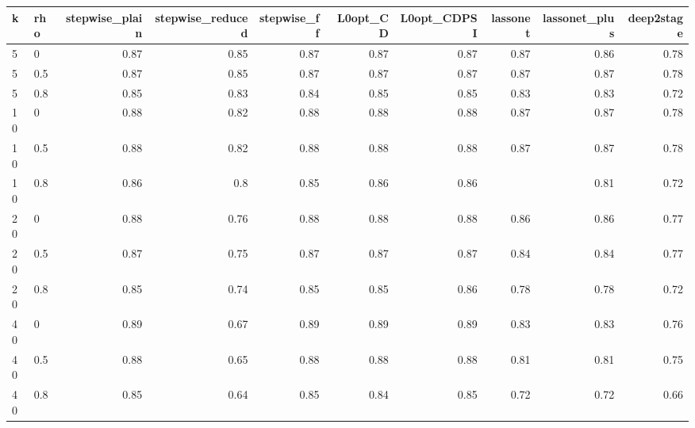 \begin{tabular}{llrrrrrrrr}
\toprule
k & rho & stepwise\_plain & stepwise\_reduced & stepwise\_ff & L0opt\_CD & L0opt\_CDPSI & lassonet & lassonet\_plus & deep2stage \\
\midrule
5 & 0 & 0.87 & 0.85 & 0.87 & 0.87 & 0.87 & 0.87 & 0.86 & 0.78 \\
5 & 0.5 & 0.87 & 0.85 & 0.87 & 0.87 & 0.87 & 0.87 & 0.87 & 0.78 \\
5 & 0.8 & 0.85 & 0.83 & 0.84 & 0.85 & 0.85 & 0.83 & 0.83 & 0.72 \\
10 & 0 & 0.88 & 0.82 & 0.88 & 0.88 & 0.88 & 0.87 & 0.87 & 0.78 \\
10 & 0.5 & 0.88 & 0.82 & 0.88 & 0.88 & 0.88 & 0.87 & 0.87 & 0.78 \\
10 & 0.8 & 0.86 & 0.8 & 0.85 & 0.86 & 0.86 &  & 0.81 & 0.72 \\
20 & 0 & 0.88 & 0.76 & 0.88 & 0.88 & 0.88 & 0.86 & 0.86 & 0.77 \\
20 & 0.5 & 0.87 & 0.75 & 0.87 & 0.87 & 0.87 & 0.84 & 0.84 & 0.77 \\
20 & 0.8 & 0.85 & 0.74 & 0.85 & 0.85 & 0.86 & 0.78 & 0.78 & 0.72 \\
40 & 0 & 0.89 & 0.67 & 0.89 & 0.89 & 0.89 & 0.83 & 0.83 & 0.76 \\
40 & 0.5 & 0.88 & 0.65 & 0.88 & 0.88 & 0.88 & 0.81 & 0.81 & 0.75 \\
40 & 0.8 & 0.85 & 0.64 & 0.85 & 0.84 & 0.85 & 0.72 & 0.72 & 0.66 \\
\bottomrule
\end{tabular}
